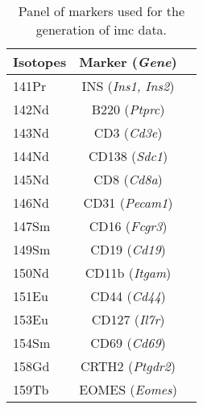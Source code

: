 \vspace{-30pt}
\begin{table}[ht!]
  \renewcommand{\arraystretch}{0.9} %
  \centering
   \caption[Panel of markers used for the generation of  data]{Panel of markers used for the generation of \gls{imc} data.}
  \label{tab:app_imc_panel}
  \begin{tabularx}{\textwidth}{xCC}
    \toprule
        \textbf{Isotopes} & \textbf{Marker (\textit{Gene})} & 
     \\
    \midrule
    141Pr & INS (\textit{Ins1, Ins2}) &  \\
    \midrule
    142Nd & B220 (\textit{Ptprc}) &  \\
    \midrule
    143Nd & CD3 (\textit{Cd3e}) &  \\
    \midrule
    144Nd & CD138 (\textit{Sdc1}) &  \\
    \midrule
    145Nd & CD8 (\textit{Cd8a}) &  \\
    \midrule
    146Nd & CD31 (\textit{Pecam1}) &  \\
    \midrule
    147Sm & CD16 (\textit{Fcgr3}) &  \\
    \midrule
    149Sm & CD19 (\textit{Cd19}) &  \\
    \midrule
    150Nd & CD11b (\textit{Itgam}) &   \\
    \midrule
    151Eu & CD44 (\textit{Cd44}) &  \\
    \midrule
    153Eu & CD127 (\textit{Il7r}) &   \\
    \midrule
    154Sm & CD69 (\textit{Cd69}) &   \\
    \midrule
    158Gd & CRTH2 (\textit{Ptgdr2}) & \RaggedRight{} \\
    \midrule
    159Tb & EOMES (\textit{Eomes}) &  \\

\end{tabularx}
\end{table}
